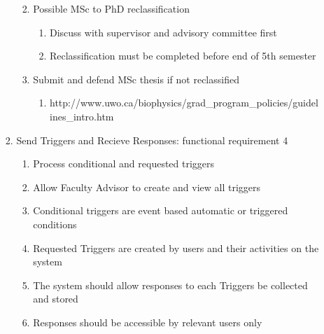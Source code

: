 \documentclass{journal}
\begin{document}
\begin{enumerate}
\begin{enumerate}
\begin{enumerate}
\begin{enumerate}
\begin{enumerate}
			\end{enumerate}
			\item Possible MSc to PhD reclassification
			\begin{enumerate}
			\item Discuss with supervisor and advisory committee first
			\item Reclassification must be completed before end of 5th semester
			\end{enumerate}
			\item Submit and defend MSc thesis if not reclassified
			\begin{enumerate}
			\item http://www.uwo.ca/biophysics/grad\_program\_policies/guidelines\_intro.htm
			\end{enumerate}
    \end{enumerate}
\item Send Triggers and Recieve Responses: functional requirement 4
\begin{enumerate}
\item Process conditional and requested triggers
\item Allow Faculty Advisor to create and view all triggers
\item Conditional triggers are event based automatic or triggered conditions
\item Requested Triggers are created by users and their activities on the system
\item The system should allow responses to each Triggers be collected and stored
\item Responses should be accessible by relevant users only 
\end{enumerate}
\end{enumerate}
\end{enumerate}
\end{enumerate}
\end{document}
